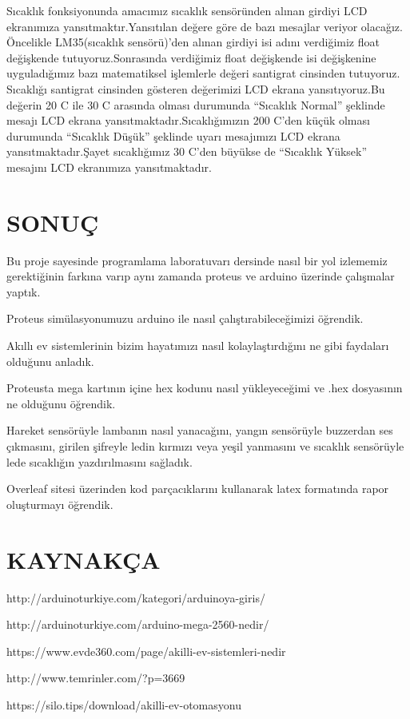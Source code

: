 \documentclass[conference]{IEEEtran}
\begin{document}
Sıcaklık fonksiyonunda amacımız sıcaklık sensöründen alınan girdiyi LCD ekranımıza yansıtmaktır.Yansıtılan değere göre de bazı mesajlar veriyor olacağız.
Öncelikle LM35(sıcaklık sensörü)’den alınan girdiyi isi adını verdiğimiz float değişkende tutuyoruz.Sonrasında verdiğimiz float değişkende isi değişkenine uyguladığımız bazı matematiksel işlemlerle değeri santigrat cinsinden tutuyoruz. Sıcaklığı santigrat cinsinden gösteren değerimizi LCD ekrana yansıtıyoruz.Bu değerin 20 C ile 30 C arasında olması durumunda “Sıcaklık Normal” şeklinde mesajı LCD ekrana yansıtmaktadır.Sıcaklığımızın 200 C’den küçük olması durumunda “Sıcaklık Düşük” şeklinde uyarı mesajımızı LCD ekrana yansıtmaktadır.Şayet sıcaklığımız 30 C’den büyükse de “Sıcaklık Yüksek” mesajını LCD ekranımıza yansıtmaktadır.


\section{SONUÇ}
Bu proje sayesinde programlama laboratuvarı dersinde nasıl bir 
yol izlememiz gerektiğinin farkına varıp aynı zamanda proteus ve arduino üzerinde çalışmalar yaptık.

Proteus simülasyonumuzu arduino ile nasıl çalıştırabileceğimizi öğrendik.

Akıllı ev sistemlerinin bizim hayatımızı nasıl kolaylaştırdığını ne gibi faydaları olduğunu anladık.

Proteusta mega kartının içine hex kodunu nasıl yükleyeceğimi ve .hex dosyasının ne olduğunu öğrendik.

Hareket sensörüyle lambanın nasıl yanacağını, yangın sensörüyle buzzerdan ses çıkmasını, girilen şifreyle ledin kırmızı veya yeşil yanmasını ve sıcaklık sensörüyle lede sıcaklığın yazdırılmasını sağladık.

Overleaf sitesi üzerinden kod parçacıklarını kullanarak latex formatında rapor oluşturmayı öğrendik.


\section{KAYNAKÇA}
http://arduinoturkiye.com/kategori/arduinoya-giris/

http://arduinoturkiye.com/arduino-mega-2560-nedir/

https://www.evde360.com/page/akilli-ev-sistemleri-nedir

http://www.temrinler.com/?p=3669

https://silo.tips/download/akilli-ev-otomasyonu
\end{document}
